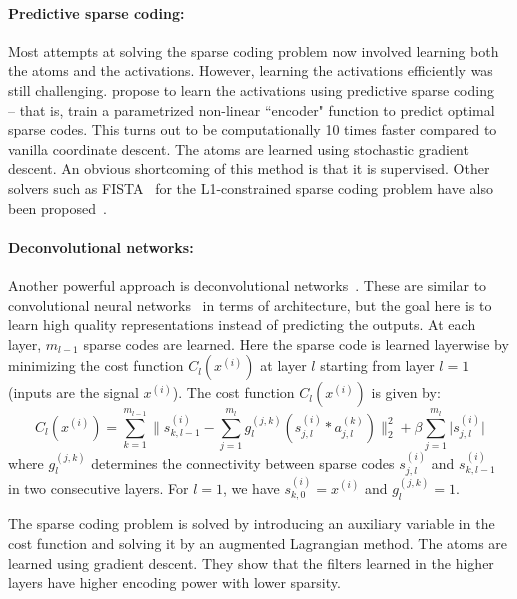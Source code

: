 \paragraph{Predictive sparse coding:} Most attempts at solving the sparse coding problem now involved learning both the atoms and the activations. However, learning the activations efficiently was still challenging. \citet{kavukcuoglu2010learning} propose to learn the activations using predictive sparse coding~\citep{gregor2010learning} -- that is, train a parametrized non-linear ``encoder" function to predict optimal sparse codes. This turns out to be computationally 10 times faster compared to vanilla coordinate descent. The atoms are learned using stochastic gradient descent. An obvious shortcoming of this method is that it is supervised. Other solvers such as FISTA~\citep{beck2009fast} for the L1-constrained sparse coding problem have also been proposed~\citep{chalasani2013fast}.

\paragraph{Deconvolutional networks:} Another powerful approach is deconvolutional networks~\citep{zeiler2010deconvolutional}. These are similar to convolutional neural networks~\citep{lecun1989backpropagation} in terms of architecture, but the goal here is to learn high quality representations instead of predicting the outputs. At each layer, $m_{l-1}$ sparse codes are learned. Here the sparse code is learned layerwise by minimizing the cost function $C_l(x^{(i)})$ at layer $l$ starting from layer $l=1$ (inputs are the signal $x^{(i)}$). The cost function $C_l(x^{(i)})$ is given by:
%
\begin{equation}
C_l(x^{(i)}) = \sum_{k=1}^{m_{l-1}} \|s^{(i)}_{k, l-1} - \sum_{j=1}^{m_l} g_{l}^{(j,k)} (s^{(i)}_{j,l} * a^{(k)}_{j, l}) \|_{2}^{2} + \beta \sum_{j=1}^{m_l} \lvert s^{(i)}_{j,l} \rvert
\end{equation}
%
where $g_{l}^{(j,k)}$ determines the connectivity between sparse codes $s^{(i)}_{j,l}$ and $s^{(i)}_{k,l-1}$ in two consecutive layers. For $l=1$, we have $s^{(i)}_{k,0} = x^{(i)}$ and $g_{l}^{(j,k)}=1$.

The sparse coding problem is solved by introducing an auxiliary variable in the cost function and solving it by an augmented Lagrangian method. The atoms are learned using gradient descent. They show that the filters learned in the higher layers have higher encoding power with lower sparsity.

